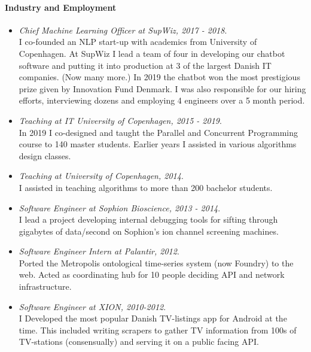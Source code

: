 \documentclass[11pt]{article}
\begin{document}
\paragraph{Industry and Employment}
\begin{itemize}
   \item[]
   \emph{Chief Machine Learning Officer at SupWiz, 2017 - 2018}.
   \\
   I co-founded an NLP start-up with academics from University of Copenhagen.
               At SupWiz I lead a team of four in developing our chatbot software and putting it into production at 3 of the largest Danish IT companies. (Now many more.)
               In 2019 the chatbot won the most prestigious prize given by Innovation Fund Denmark.
               I was also responsible for our hiring efforts, interviewing dozens and employing 4 engineers over a 5 month period.
               
   \item[]
   \emph{Teaching at IT University of Copenhagen, 2015 - 2019}.
   \\
   In 2019 I co-designed and taught the Parallel and Concurrent Programming course to 140 master students.
               Earlier years I assisted in various algorithms design classes.
            
   \item[]
   \emph{Teaching at University of Copenhagen, 2014}.
   \\
   I assisted in teaching algorithms to more than 200 bachelor students.
   \item[]
   \emph{Software Engineer at Sophion Bioscience, 2013 - 2014}.
   \\
   I lead a project developing internal debugging tools for sifting through gigabytes of data/second on Sophion's ion channel screening machines.
   \item[]
   \emph{Software Engineer Intern at Palantir, 2012}.
   \\
   Ported the Metropolis ontological time-series system (now Foundry) to the web.
               Acted as coordinating hub for 10 people deciding API and network infrastructure.
   \item[]
   \emph{Software Engineer at XION, 2010-2012}.
   \\
   I Developed the most popular Danish TV-listings app for Android at the time.
               This included writing scrapers to gather TV information from 100s of TV-stations (consensually) and serving it on a public facing API.
\end{itemize}
\end{document}
